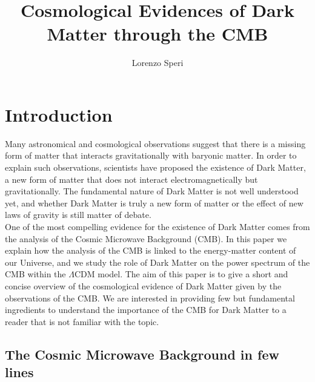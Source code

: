 \documentclass{article}
\title{Cosmological Evidences of Dark Matter through the CMB}
\author{Lorenzo Speri}
\date{}
\begin{document}
\maketitle


\section{Introduction}
Many astronomical and cosmological observations suggest that there is a missing form of matter that interacts gravitationally with baryonic matter. 
In order to explain such observations, scientists have proposed the existence of Dark Matter, a new form of matter that does not interact electromagnetically but gravitationally.
The fundamental nature of Dark Matter is not well understood yet, and whether Dark Matter is truly a new form of matter or the effect of new laws of gravity is still matter of debate.\\
One of the most compelling evidence for the existence of Dark Matter comes from the analysis of the Cosmic Microwave Background (CMB).
In this paper we explain how the analysis of the CMB is linked to the energy-matter content of our Universe, and we study the role of Dark Matter on the power spectrum of the CMB within the $\Lambda$CDM model.
The aim of this paper is to give a short and concise overview of the cosmological evidence of Dark Matter given by the observations of the CMB.
We are interested in providing few but fundamental ingredients to understand the importance of the CMB for Dark Matter to a reader that is not familiar with the topic.
\\
 

\subsection{The Cosmic Microwave Background in few lines}
\end{document}
